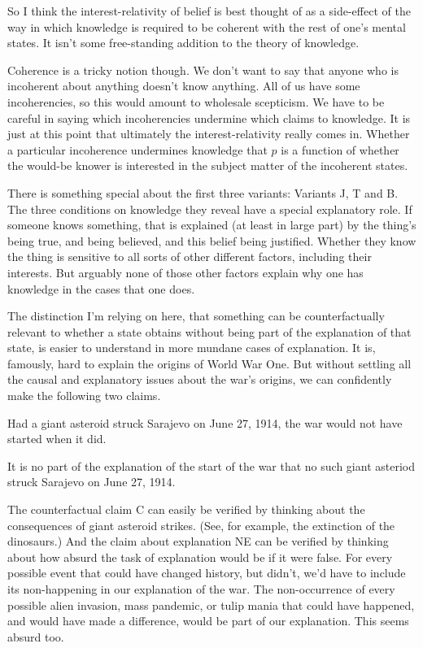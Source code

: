 \documentclass[11pt,]{book}
\providecommand{\tightlist}{%
  \setlength{\itemsep}{0pt}\setlength{\parskip}{0pt}}
\begin{document}
So I think the interest-relativity of belief is best thought of as a side-effect of the way in which knowledge is required to be coherent with the rest of one's mental states. It isn't some free-standing addition to the theory of knowledge.

Coherence is a tricky notion though. We don't want to say that anyone who is incoherent about anything doesn't know anything. All of us have some incoherencies, so this would amount to wholesale scepticism. We have to be careful in saying which incoherencies undermine which claims to knowledge. It is just at this point that ultimately the interest-relativity really comes in. Whether a particular incoherence undermines knowledge that \(p\) is a function of whether the would-be knower is interested in the subject matter of the incoherent states.

There is something special about the first three variants: Variants J, T and B. The three conditions on knowledge they reveal have a special explanatory role. If someone knows something, that is explained (at least in large part) by the thing's being true, and being believed, and this belief being justified. Whether they know the thing is sensitive to all sorts of other different factors, including their interests. But arguably none of those other factors explain why one has knowledge in the cases that one does.

The distinction I'm relying on here, that something can be counterfactually relevant to whether a state obtains without being part of the explanation of that state, is easier to understand in more mundane cases of explanation. It is, famously, hard to explain the origins of World War One. But without settling all the causal and explanatory issues about the war's origins, we can confidently make the following two claims.

\begin{description}
\tightlist
\item[C]
Had a giant asteroid struck Sarajevo on June 27, 1914, the war would not have started when it did.
\item[NE]
It is no part of the explanation of the start of the war that no such giant asteriod struck Sarajevo on June 27, 1914.
\end{description}

The counterfactual claim C can easily be verified by thinking about the consequences of giant asteroid strikes. (See, for example, the extinction of the dinosaurs.) And the claim about explanation NE can be verified by thinking about how absurd the task of explanation would be if it were false. For every possible event that could have changed history, but didn't, we'd have to include its non-happening in our explanation of the war. The non-occurrence of every possible alien invasion, mass pandemic, or tulip mania that could have happened, and would have made a difference, would be part of our explanation. This seems absurd too.
\end{document}
